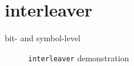 % 
%

\section{interleaver}
\label{module:interleaver}
bit- and symbol-level

\begin{figure}
\centering
{}
\caption{{\tt interleaver} demonstration}
\label{fig:module:interleaver:scatterplot}
\end{figure}


